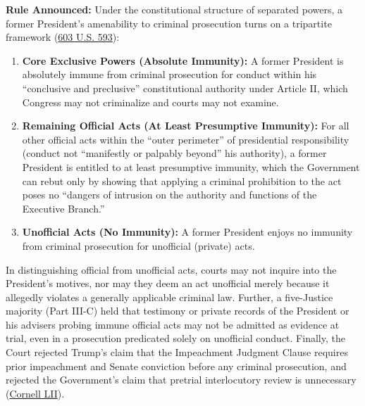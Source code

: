 \documentclass[12pt]{article}
\begin{document}
\textbf{Rule Announced:} Under the constitutional structure of separated powers, a former President's amenability to criminal prosecution turns on a tripartite framework (\href{https://www.law.cornell.edu/supremecourt/text/23-939}{603 U.S. 593}):
\begin{enumerate}
\item \textbf{Core Exclusive Powers (Absolute Immunity):} A former President is absolutely immune from criminal prosecution for conduct within his ``conclusive and preclusive'' constitutional authority under Article II, which Congress may not criminalize and courts may not examine.
\item \textbf{Remaining Official Acts (At Least Presumptive Immunity):} For all other official acts within the ``outer perimeter'' of presidential responsibility (conduct not ``manifestly or palpably beyond'' his authority), a former President is entitled to at least presumptive immunity, which the Government can rebut only by showing that applying a criminal prohibition to the act poses no ``dangers of intrusion on the authority and functions of the Executive Branch.''
\item \textbf{Unofficial Acts (No Immunity):} A former President enjoys no immunity from criminal prosecution for unofficial (private) acts.
\end{enumerate}

In distinguishing official from unofficial acts, courts may not inquire into the President's motives, nor may they deem an act unofficial merely because it allegedly violates a generally applicable criminal law. Further, a five-Justice majority (Part III-C) held that testimony or private records of the President or his advisers probing immune official acts may not be admitted as evidence at trial, even in a prosecution predicated solely on unofficial conduct. Finally, the Court rejected Trump's claim that the Impeachment Judgment Clause requires prior impeachment and Senate conviction before any criminal prosecution, and rejected the Government's claim that pretrial interlocutory review is unnecessary (\href{https://www.law.cornell.edu/supremecourt/text/23-939}{Cornell LII}).
\end{document}
